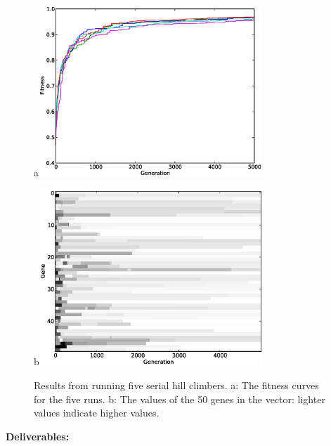 \documentclass[12pt]{article}
\begin{document}
\begin{figure}[!t]
\centerline{a\includegraphics[width=0.75\textwidth]{Fits.eps}}
\centerline{b\includegraphics[width=0.75\textwidth]{Genes.eps}}
\caption{Results from running five serial hill climbers.
a: The fitness curves for the five runs.
b: The values of the 50 genes in the vector: lighter values indicate higher values.}
\label{Fig}
\end{figure}

\noindent \textbf{Deliverables:}
\end{document}

